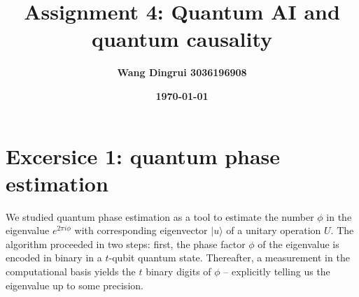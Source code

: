 \documentclass[12pt]{article}
\title{\textbf{Assignment 4: Quantum AI and quantum causality}}
\author{\textbf{Wang Dingrui 3036196908}}
\date{\textbf{\today}}
\begin{document}
\maketitle

\section{Excersice 1: quantum phase estimation}
We studied quantum phase estimation as a tool to estimate the number $\phi$ in the eigenvalue $e^{2\pi i\phi}$ with corresponding eigenvector $|u\rangle$ of a unitary operation $U$. The algorithm proceeded in two steps: first, the phase factor $\phi$ of the eigenvalue is encoded in binary in a $t$-qubit quantum state. Thereafter, a measurement in the computational basis yields the $t$ binary digits of $\phi$ – explicitly telling us the eigenvalue up to some precision.
\end{document}
